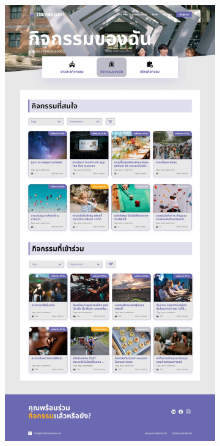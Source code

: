 \begin{figure}[h]
  \centering
  \begin{subfigure}[b]{0.3\linewidth}
    \includegraphics[width=\linewidth]{image/Figma-design/New-Mine-event.jpg}

\end{subfigure}
\end{figure}
